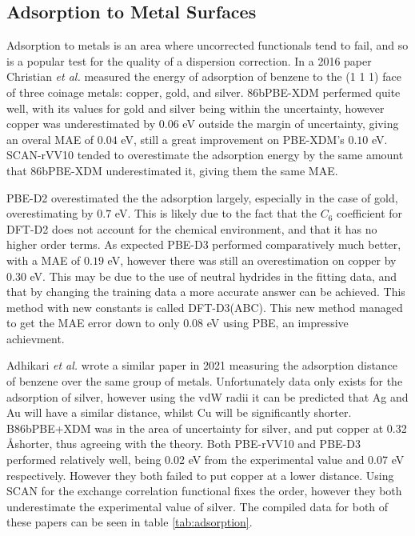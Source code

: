 \documentclass[10pt,a4paper,twocolumn,twoside]{extarticle}
\newcommand{\al}{\emph{et al. }}
\newcommand{\oA}{\si{\angstrom}}
\begin{document}
	\subsection{Adsorption to Metal Surfaces}
	\label{sec:adsorption}
	Adsorption to metals is an area where uncorrected functionals tend to fail, and so is a popular test for the quality of a dispersion correction. In a 2016 paper Christian \al measured\cite{Christian2016-CoinageAdsorption} the energy of adsorption of benzene to the (1 1 1) face of three coinage metals: copper, gold, and silver. 86bPBE-XDM perfermed quite well, with its values for gold and silver being within the uncertainty, however copper was underestimated by $0.06$ eV outside the margin of uncertainty, giving an overal MAE of  $0.04$ eV, still a great improvement on PBE-XDM's $0.10$ eV. SCAN-rVV10 tended to overestimate the adsorption energy by the same amount that 86bPBE-XDM underestimated it, giving them the same MAE. 

	PBE-D2 overestimated the the adsorption largely, especially in the case of gold, overestimating by $0.7$ eV. This is likely due to the fact that the $C_6$ coefficient for DFT-D2 does not account for the chemical environment, and that it has no higher order terms. As expected PBE-D3 performed comparatively much better, with a MAE of $0.19$ eV, however there was still an overestimation on copper by $0.30$ eV. This may be due to the use of neutral hydrides in the fitting data, and that by changing the training data a more accurate answer can be achieved. \cite{D3-ABC} This method with new constants is called DFT-D3(ABC). This new method managed to get the MAE error down to only $0.08$ eV using PBE, an impressive achievment.

	Adhikari \al wrote a similar paper in 2021 \cite{VV10-Adsorption} measuring the adsorption distance of benzene over the same group of metals. Unfortunately data only exists for the adsorption of silver, however using the vdW radii it can be predicted that Ag and Au will have a similar distance, whilst Cu will be significantly shorter. B86bPBE+XDM was in the area of uncertainty for silver, and put copper at 0.32 \oA shorter, thus agreeing with the theory. Both PBE-rVV10 and PBE-D3 performed relatively well, being 0.02 eV from the experimental value and 0.07 eV respectively. However they both failed to put copper at a lower distance. Using SCAN for the exchange correlation functional fixes the order, however they both underestimate the experimental value of silver. The compiled data for both of these papers can be seen in table \ref{tab:adsorption}.
\end{document}
